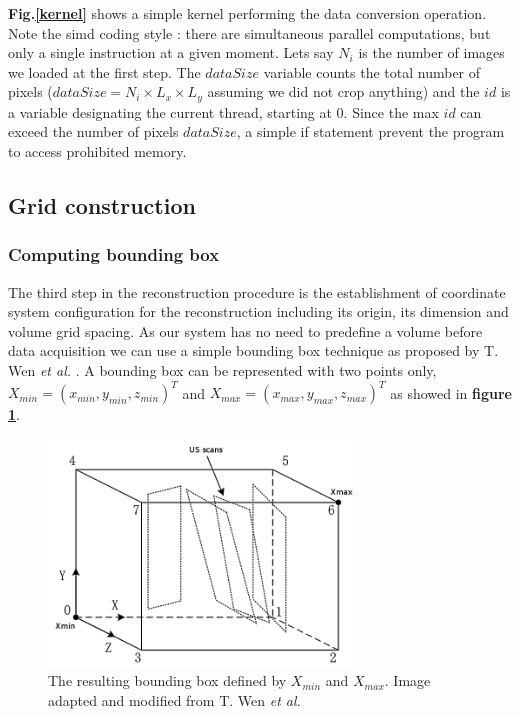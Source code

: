 \documentclass[12pt,journal,compsoc]{IEEEtran}
\begin{document}
\textbf{Fig.\ref{kernel}} shows a simple kernel performing the data conversion operation. Note the \ac{simd} coding style : there are simultaneous parallel computations, but only a single instruction at a given moment. Lets say $N_i$ is the number of images we loaded at the first step. 
The $dataSize$ variable counts the total number of pixels ($dataSize=N_i\times L_x\times L_y$ assuming we did not crop anything) and the $id$ is a variable designating the current thread, starting at 0. Since the max $id$ can exceed the number of pixels $dataSize$, a simple if statement prevent the program to access prohibited memory. 

\subsection{Grid construction}

\subsubsection{Computing bounding box}

The third step in the reconstruction procedure is the establishment of coordinate system configuration for the reconstruction including its origin, its dimension and volume grid spacing. 
As our system has no need to predefine a volume before data acquisition we can use a simple bounding box technique as proposed by T. Wen \textit{et al.} \cite{2}.
A bounding box can be represented with two points only, $X_{min} = (x_{min},y_{min},z_{min})^T$ and $X_{max} = (x_{max}, y_{max}, z_{max})^T$ as showed in \textbf{figure \ref{bounding_box}}.

\begin{figure}[ht!]
\centering
\includegraphics[width=3.2in]{bounding_box}
\caption{The resulting bounding box defined by $X_{min}$ and $X_{max}$. Image adapted and modified from T. Wen \textit{et al.} \cite{2}}
\label{bounding_box}
\end{figure}
\end{document}
